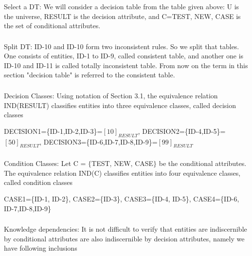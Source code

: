 \documentclass[12pt]{article}
\begin{document}
\subsubsection {}Select a DT: We will consider a decision table from the table given above: U is the universe, RESULT is the decision attribute, and C={TEST, NEW, CASE} is the set of conditional attributes.

\subsubsection {}Split DT: ID-10 and ID-10 form two inconsistent rules. So we split that tables. One consists of entities, ID-1 to ID-9, called consistent table, and another one is ID-10 and ID-11 is called totally inconsistent table. From now on the term in this section "decision table" is referred to the consistent table.
\subsubsection {} Decision Classes: Using notation of Section 3.1, the equivalence relation IND(RESULT) classifies entities into three equivalence classes, called decision classes 
\begin{center}
   DECISION1=\{ID-1,ID-2,ID-3\}=$[10]_{RESULT}$, \newline
   DECISION2=\{ID-4,ID-5\}=$[50]_{RESULT}$, \newline
   DECISION3=\{ID-6,ID-7,ID-8,ID-9\}=$[ 99]_{RESULT}$ \newline  
\end{center}

\subsubsection {}Condition Classes: Let C = $\{$TEST, NEW, CASE$\}$ be the conditional attributes. The equivalence relation IND(C) classifies entities into four equivalence classes, called condition classes

\begin{center}
CASE1=\{ID-1, ID-2\}, CASE2=\{ID-3\}, \newline
CASE3=\{ID-4, ID-5\}, CASE4=\{ID-6, ID-7,ID-8,ID-9\} \newline
\end{center}

\subsubsection {}Knowledge  dependencies: It is not difficult to verify that entities are indiscernible by conditional attributes are also indiscernible by decision attributes, namely we have following inclusions
\end{document}
